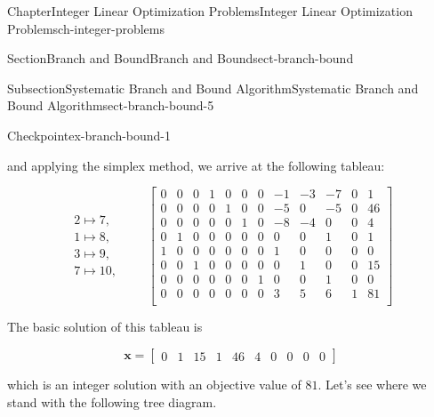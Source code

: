 \documentclass[oneside,10pt,]{book}
\numberwithin{equation}{section}
\newcommand{\amp}{&}
\begin{document}
\begin{chapterptx}{Chapter}{Integer Linear Optimization Problems}{}{Integer Linear Optimization Problems}{}{}{ch-integer-problems}
\begin{sectionptx}{Section}{Branch and Bound}{}{Branch and Bound}{}{}{sect-branch-bound}
\begin{subsectionptx}{Subsection}{Systematic Branch and Bound Algorithm}{}{Systematic Branch and Bound Algorithm}{}{}{sect-branch-bound-5}
\begin{inlineexercise}{Checkpoint}{}{ex-branch-bound-1}
\begin{equation*}
\end{equation*}
%
\par
and applying the simplex method, we arrive at the following tableau:%
\par
%
\begin{equation*}
\begin{array}{r} 2 \mapsto 7, \\ 1 \mapsto 8, \\ 3 \mapsto 9, \\ 7 \mapsto 10, \end{array} \qquad \left[\begin{array}{rrr|rrrrrrrr|r} 0 \amp 0 \amp 0 \amp 1 \amp 0 \amp 0 \amp 0 \amp -1 \amp -3 \amp -7 \amp 0 \amp 1\\ 0 \amp 0 \amp 0 \amp 0 \amp 1 \amp 0 \amp 0 \amp -5 \amp 0 \amp -5 \amp 0 \amp 46\\ 0 \amp 0 \amp 0 \amp 0 \amp 0 \amp 1 \amp 0 \amp -8 \amp -4 \amp 0 \amp 0 \amp 4\\ 0 \amp 1 \amp 0 \amp 0 \amp 0 \amp 0 \amp 0 \amp 0 \amp 0 \amp 1 \amp 0 \amp 1\\ 1 \amp 0 \amp 0 \amp 0 \amp 0 \amp 0 \amp 0 \amp 1 \amp 0 \amp 0 \amp 0 \amp 0\\ 0 \amp 0 \amp 1 \amp 0 \amp 0 \amp 0 \amp 0 \amp 0 \amp 1 \amp 0 \amp 0 \amp 15\\ 0 \amp 0 \amp 0 \amp 0 \amp 0 \amp 0 \amp 1 \amp 0 \amp 0 \amp 1 \amp 0 \amp 0\\ \hline 0 \amp 0 \amp 0 \amp 0 \amp 0 \amp 0 \amp 0 \amp 3 \amp 5 \amp 6 \amp 1 \amp 81\\ \end{array} \right]
\end{equation*}
%
\par
The basic solution of this tableau is%
\par
%
\begin{equation*}
\boldsymbol{x} = \left[\begin{array}{rrr|rrrrrrr} 0 \amp 1 \amp 15 \amp 1 \amp 46 \amp 4 \amp 0 \amp 0 \amp 0 \amp 0  \end{array}\right]
\end{equation*}
%
\par
which is an integer solution with an objective value of \(81\). Let's see where we stand with the following tree diagram.%
\end{inlineexercise}%
\end{subsectionptx}
\end{sectionptx}
\end{chapterptx}
\end{document}
